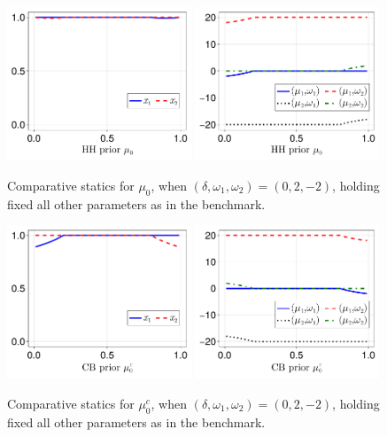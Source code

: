 \documentclass[12pt,a4paper]{article}
\begin{document}
\begin{figure}[H]
\centering
\includegraphics[width=0.49\textwidth]{figures/V8/γ_10/fig_optimal_π_across_μ_0_ω_1_2_ω_2_-2_δ_0.0_.pdf}
\includegraphics[width=0.49\textwidth]{figures/V8/γ_10/fig_posterior_across_μ_0_ω_1_2_ω_2_-2_δ_0.0_.pdf}
\caption{Comparative statics for $\mu_0$, when $(\delta,\omega_1,\omega_2)=(0,2,-2)$, holding fixed all other parameters as in the benchmark.}
\label{FigureA9}
\end{figure}

\begin{figure}[H]
\centering
\includegraphics[width=0.49\textwidth]{figures/V8/γ_10/fig_optimal_π_across_μ_0_c_ω_1_2_ω_2_-2_δ_0.0_.pdf}
\includegraphics[width=0.49\textwidth]{figures/V8/γ_10/fig_posterior_across_μ_0_c_ω_1_2_ω_2_-2_δ_0.0_.pdf}
\caption{Comparative statics for $\mu_0^c$, when $(\delta,\omega_1,\omega_2)=(0,2,-2)$, holding fixed all other parameters as in the benchmark.}
\label{FigureA10}
\end{figure}
\end{document}
